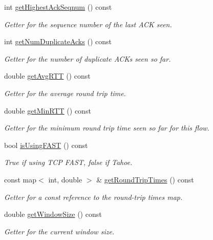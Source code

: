 \begin{DoxyCompactItemize}
int \hyperlink{classnetflow_ac27a75c664720d1da286ec61906564db}{get\-Highest\-Ack\-Seqnum} () const 
\begin{DoxyCompactList}\small\item\em Getter for the sequence number of the last A\-C\-K seen. \end{DoxyCompactList}\item 
int \hyperlink{classnetflow_abee82205b8482a99036148d7ef869ae2}{get\-Num\-Duplicate\-Acks} () const 
\begin{DoxyCompactList}\small\item\em Getter for the number of duplicate A\-C\-Ks seen so far. \end{DoxyCompactList}\item 
double \hyperlink{classnetflow_a4825a3c57231c9f474e9cd1a76e60f66}{get\-Avg\-R\-T\-T} () const 
\begin{DoxyCompactList}\small\item\em Getter for the average round trip time. \end{DoxyCompactList}\item 
double \hyperlink{classnetflow_a58b013589d73c37349547c37a35db128}{get\-Min\-R\-T\-T} () const 
\begin{DoxyCompactList}\small\item\em Getter for the minimum round trip time seen so far for this flow. \end{DoxyCompactList}\item 
bool \hyperlink{classnetflow_ababb5a520cb2b826ad906bd9cade0ecb}{is\-Using\-F\-A\-S\-T} () const 
\begin{DoxyCompactList}\small\item\em True if using T\-C\-P F\-A\-S\-T, false if Tahoe. \end{DoxyCompactList}\item 
const map$<$ int, double $>$ \& \hyperlink{classnetflow_a08f6d8d01f51c861a00710a533f3b604}{get\-Round\-Trip\-Times} () const 
\begin{DoxyCompactList}\small\item\em Getter for a const reference to the round-\/trip times map. \end{DoxyCompactList}\item 
double \hyperlink{classnetflow_aa73fac7bfc0f25946e7b345f46115dc9}{get\-Window\-Size} () const 
\begin{DoxyCompactList}\small\item\em Getter for the current window size. \end{DoxyCompactList}\item 

\end{DoxyCompactItemize}
